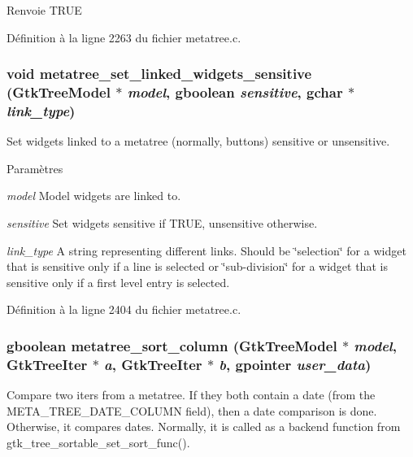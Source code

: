 \begin{DoxyReturn}{Renvoie}
TRUE 
\end{DoxyReturn}


Définition à la ligne 2263 du fichier metatree.c.

\subsubsection[{metatree\_\-set\_\-linked\_\-widgets\_\-sensitive}]{\setlength{\rightskip}{0pt plus 5cm}void metatree\_\-set\_\-linked\_\-widgets\_\-sensitive (GtkTreeModel $\ast$ {\em model}, \/  gboolean {\em sensitive}, \/  gchar $\ast$ {\em link\_\-type})}\label{metatree_8h_a5d0b0e8fc74bc89dc56d5fe7a45c22a9}
Set widgets linked to a metatree (normally, buttons) sensitive or unsensitive.


\begin{DoxyParams}{Paramètres}
\item[{\em model}]Model widgets are linked to. \item[{\em sensitive}]Set widgets sensitive if TRUE, unsensitive otherwise. \item[{\em link\_\-type}]A string representing different links. Should be \char`\"{}selection\char`\"{} for a widget that is sensitive only if a line is selected or \char`\"{}sub-\/division\char`\"{} for a widget that is sensitive only if a first level entry is selected. \end{DoxyParams}


Définition à la ligne 2404 du fichier metatree.c.

\subsubsection[{metatree\_\-sort\_\-column}]{\setlength{\rightskip}{0pt plus 5cm}gboolean metatree\_\-sort\_\-column (GtkTreeModel $\ast$ {\em model}, \/  GtkTreeIter $\ast$ {\em a}, \/  GtkTreeIter $\ast$ {\em b}, \/  gpointer {\em user\_\-data})}\label{metatree_8h_aed0f925684f06f89a0fedaf4d4a9ad11}
Compare two iters from a metatree. If they both contain a date (from the META\_\-TREE\_\-DATE\_\-COLUMN field), then a date comparison is done. Otherwise, it compares dates. Normally, it is called as a backend function from gtk\_\-tree\_\-sortable\_\-set\_\-sort\_\-func().


